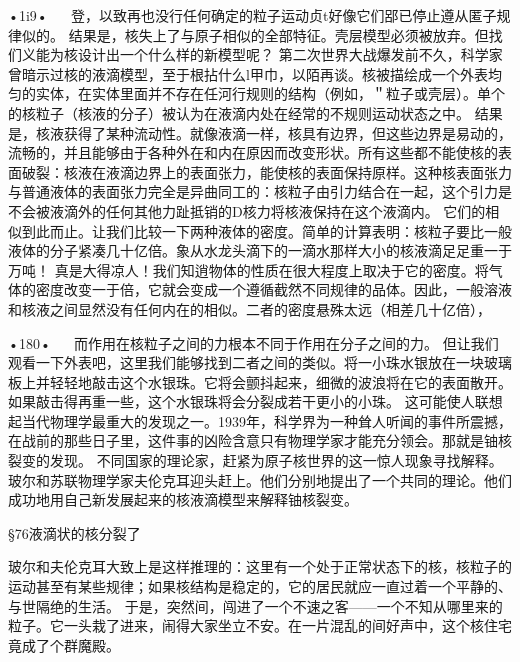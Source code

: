 •1i9•
  
登，以致再也没行任何确定的粒子运动贞t好像它们郘已停止遵从匿子规律似的。
结果是，核失上了与原子相似的全部特征。壳层模型必须被放弃。但找们义能为核设计出一个什么样的新模型呢？
第二次世界大战爆发前不久，科学家曾暗示过核的液滴模型，至于根拈什么l甲巾，以陌再谈。核被描绘成一个外表均匀的实体，在实体里面并不存在任河行规则的结构（例如，＂粒子或壳层）。单个的核粒子（核液的分子）被认为在液滴内处在经常的不规则运动状态之中。
结果是，核液获得了某种流动性。就像液滴一样，核具有边界，但这些边界是易动的，流畅的，并且能够由于各种外在和内在原因而改变形状。所有这些都不能使核的表面破裂：核液在液滴边界上的表面张力，能使核的表面保持原样。这种核表面张力与普通液体的表面张力完全是异曲同工的：核粒子由引力结合在一起，这个引力是不会被液滴外的任何其他力趾抵销的D核力将核液保持在这个液滴内。
它们的相似到此而止。让我们比较一下两种液体的密度。简单的计算表明：核粒子要比一般液体的分子紧凑几十亿倍。象从水龙头滴下的一滴水那样大小的核液滴足足重一于万吨！
真是大得凉人！我们知逍物体的性质在很大程度上取决于它的密度。将气体的密度改变一于倍，它就会变成一个遵循截然不同规律的品体。因此，一般溶液和核液之间显然没有任何内在的相似。二者的密度悬殊太远（相差几十亿倍），

•180•
  
而作用在核粒子之间的力根本不同于作用在分子之间的力。
但让我们观看一下外表吧，这里我们能够找到二者之间的类似。将一小珠水银放在一块玻璃板上并轻轻地敲击这个水银珠。它将会颤抖起来，细微的波浪将在它的表面散开。如果敲击得再重一些，这个水银珠将会分裂成若干更小的小珠。
这可能使人联想起当代物理学最重大的发现之一。1939年，科学界为一种耸人听闻的事件所震撼，在战前的那些日子里，这件事的凶险含意只有物理学家才能充分领会。那就是铀核裂变的发现。
不同国家的理论家，赶紧为原子核世界的这一惊人现象寻找解释。玻尔和苏联物理学家夫伦克耳迎头赶上。他们分别地提出了一个共同的理论。他们成功地用自己新发展起来的核液滴模型来解释铀核裂变。

§76液滴状的核分裂了

玻尔和夫伦克耳大致上是这样推理的：这里有一个处于正常状态下的核，核粒子的运动甚至有某些规律；如果核结构是稳定的，它的居民就应一直过着一个平静的、与世隔绝的生活。
于是，突然间，闯进了一个不速之客——一个不知从哪里来的粒子。它一头栽了进来，闹得大家坐立不安。在一片混乱的间好声中，这个核住宅竟成了个群魔殿。

